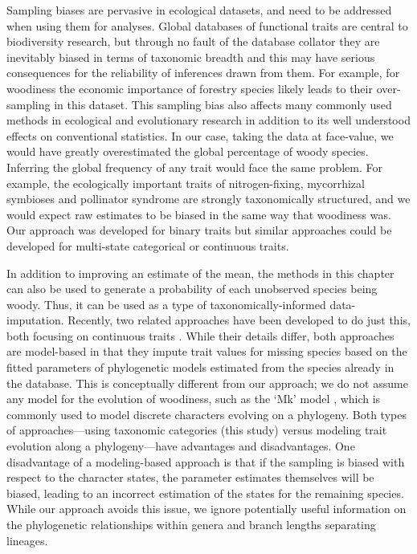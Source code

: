 Sampling biases are pervasive in ecological datasets, and need to be
addressed when using them for analyses.  Global databases of
functional traits \citep[e.g., TRY;][]{kattge2011try} are central to
biodiversity research, but through no fault of the database collator
they are inevitably biased in terms of taxonomic breadth and this may
have serious consequences for the reliability of inferences drawn from
them.  For example, for woodiness the economic importance of forestry
species likely leads to their over-sampling in this dataset.
This sampling bias also affects many commonly used methods in
ecological and evolutionary research
\citep[e.g.,][]{ackerly2000taxon,nakagawa2008missing,PennellHarmon,Pakeman2013}
in addition to its well understood effects on conventional statistics.
In our case, taking the data at face-value, we would have greatly
overestimated the global percentage of woody species.  Inferring the
global frequency of any trait would face the same problem.  For
example, the ecologically important traits of nitrogen-fixing,
mycorrhizal symbioses and pollinator syndrome are strongly
taxonomically structured, and we would expect raw estimates to be
biased in the same way that woodiness was.  Our approach was developed
for binary traits but similar approaches could be developed for
multi-state categorical or continuous traits.

In addition to improving an estimate of the mean, the methods in this
chapter can also be used to generate a probability of each unobserved
species being woody.  Thus, it can be used as a type of taxonomically-informed 
data-imputation.  Recently, two related approaches have
been developed to do just this, both focusing on continuous traits
\citep{Swenson2013, PEM}.  While their details differ, both approaches
are model-based in that they impute trait values for missing species
based on the fitted parameters of phylogenetic models estimated from
the species already in the database. This is conceptually different
from our approach; we do not assume any model for the evolution of
woodiness, such as the `Mk' model \citep{Pagel1994}, which is commonly
used to model discrete characters evolving on a phylogeny. Both types
of approaches---using taxonomic categories (this study) versus
modeling trait evolution along a phylogeny---have advantages and
disadvantages.  One disadvantage of a modeling-based approach is that
if the sampling is biased with respect to the character states, the
parameter estimates themselves will be biased, leading to an incorrect
estimation of the states for the remaining species. While our approach
avoids this issue, we ignore potentially useful information on the
phylogenetic relationships within genera and branch lengths separating
lineages.

